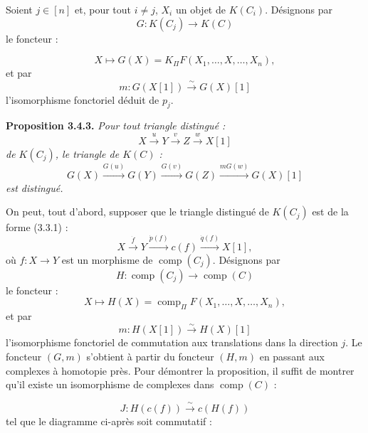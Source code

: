 \clearpage
{}%
\begingroup
\small
\setlength{\abovedisplayskip}{3pt plus 2pt minus 2pt}%
\setlength{\belowdisplayskip}{3pt plus 2pt minus 2pt}%
\setlength{\jot}{2pt}%

Soient $j\in[n]$ et, pour tout $i\neq j$, $X_i$ un objet de $K(C_i)$.
Désignons par
\[
  G\colon K(C_j)\longrightarrow K(C)
\]
le foncteur :

\begingroup
\makeatletter
\tagsleft@true
\let\veqno\@@leqno
\makeatother
\begin{equation}
  X\longmapsto G(X)=K_{\Pi}F(X_1,\ldots,X,\ldots,X_n),
  \tag{3.4.2.1}
\end{equation}
\endgroup
{}
et par
\[
  m\colon G(X[1])\xrightarrow{\sim}G(X)[1]
\]
l'isomorphisme fonctoriel déduit de $p_j$.

\noindent\textbf{Proposition 3.4.3.}\quad
\emph{Pour tout triangle distingué :}
\[
  X\xrightarrow{u}Y\xrightarrow{v}Z\xrightarrow{w}X[1]
\]
\emph{de $K(C_j)$, le triangle de $K(C)$ :}
\[
  G(X)\xrightarrow{G(u)}G(Y)\xrightarrow{G(v)}G(Z)
  \xrightarrow{mG(w)}G(X)[1]
\]
\emph{est distingué.}

On peut, tout d'abord, supposer que le triangle distingué de $K(C_j)$ est
de la forme (3.3.1) :
\[
  X\xrightarrow{\dot f}Y\xrightarrow{\dot p(f)}c(f)
  \xrightarrow{\dot q(f)}X[1],
\]
où $f\colon X\longrightarrow Y$ est un morphisme de
$\operatorname{comp}(C_j)$. Désignons par
\[
  H\colon\operatorname{comp}(C_j)\longrightarrow\operatorname{comp}(C)
\]
le foncteur :
\[
  X\longmapsto H(X)=\operatorname{comp}_{\Pi}F
  (X_1,\ldots,X,\ldots,X_n),
\]
et par
\[
  m\colon H(X[1])\xrightarrow{\sim}H(X)[1]
\]
l'isomorphisme fonctoriel de commutation aux translations dans la direction
$j$. Le foncteur $(G,m)$ s'obtient à partir du foncteur $(H,m)$ en passant
aux complexes à homotopie près. Pour démontrer la proposition, il suffit de
montrer qu'il existe un isomorphisme de complexes dans
$\operatorname{comp}(C)$ :

\[
  J\colon H(c(f))\xrightarrow{\sim}c(H(f))
\]
tel que le diagramme ci-après soit commutatif :

